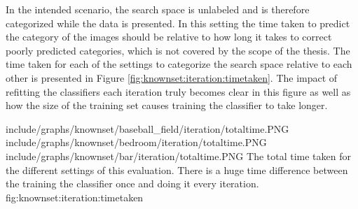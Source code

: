 In the intended scenario, the search space is unlabeled and is therefore categorized while the data is presented. In this setting the time taken to predict the category of the images should be relative to how long it takes to correct poorly predicted categories, which is not covered by the scope of the thesis. The time taken for each of the settings to categorize the search space relative to each other is presented in Figure \ref{fig:knownset:iteration:timetaken}. The impact of refitting the classifiers each iteration truly becomes clear in this figure as well as how the size of the training set causes training the classifier to take longer. 

\tripfigure
{include/graphs/knownset/baseball_field/iteration/totaltime.PNG}
{include/graphs/knownset/bedroom/iteration/totaltime.PNG}
{include/graphs/knownset/bar/iteration/totaltime.PNG}
{The total time taken for the different settings of this evaluation. There is a huge time difference between the training the classifier once and doing it every iteration.}
{fig:knownset:iteration:timetaken}
